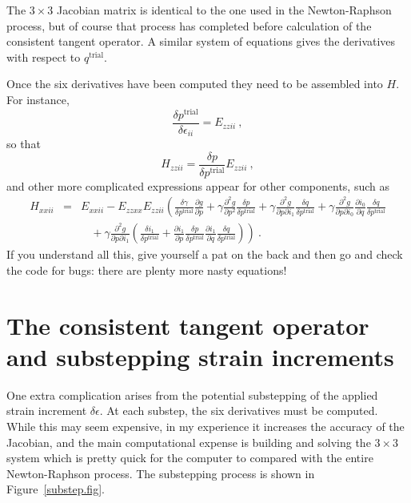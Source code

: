\documentclass[]{scrreprt}
\begin{document}
The $3\times 3$ Jacobian matrix is identical to the one used in the
Newton-Raphson process, but of course that process has completed
before calculation of the consistent tangent operator.  A similar
system of equations gives the derivatives with respect to
$q^{\mathrm{trial}}$.

Once the six derivatives have been computed they need to be assembled
into $H$.  For instance,
\begin{equation}
\frac{\delta p^{\mathrm{trial}}}{\delta \epsilon_{ii}} = E_{zzii}
\ ,
\end{equation}
so that
\begin{equation}
H_{zzii} = \frac{\delta p}{\delta p^{\mathrm{trial}}} E_{zzii} \ ,
\end{equation}
and other more complicated expressions appear for other components,
such as
\begin{eqnarray}
H_{xxii} & = & E_{xxii} - E_{zzxx} E_{zzii}\left( \frac{\delta \gamma}{\delta
  p^{\mathrm{trial}}} \frac{\partial g}{\partial p}
+ \gamma \frac{\partial^{2} g}{\partial p^{2}} \frac{\delta
  p}{\delta p^{\mathrm{trial}}}
+ \gamma \frac{\partial^{2} g}{\partial p\partial i_{1}} \frac{\delta
  q}{\delta p^{\mathrm{trial}}}
+ \gamma \frac{\partial^{2} g}{\partial p\partial i_{0}}
\frac{\partial i_{0}}{\partial q} \frac{\delta
  q}{\delta p^{\mathrm{trial}}} \right.
\nonumber \\
&& \ \ \ \
+ \left.
\gamma \frac{\partial^{2} g}{\partial p\partial i_{1}} \left(
\frac{\delta i_{1}}{\delta p^{\mathrm{trial}}} +
\frac{\partial i_{1}}{\partial p} \frac{\delta p}{\delta p^{\mathrm{trial}}}
\frac{\partial i_{1}}{\partial q} \frac{\delta q}{\delta
  p^{\mathrm{trial}}}
\right) \right) \ .
\end{eqnarray}
If you understand all this, give yourself a pat on the back and then
go and check the code for bugs: there are plenty more nasty equations!

\section{The consistent tangent operator and substepping strain
  increments}

One extra complication arises from the potential substepping of the
applied strain increment $\delta\epsilon$.  At each substep,
the six derivatives must be computed.  While this may seem expensive,
in my experience it increases the accuracy of the Jacobian, and the
main computational expense is building and solving the $3\times 3$
system which is pretty quick for the computer to compared with the
entire Newton-Raphson process.  The substepping process is shown in
Figure~\ref{substep.fig}.
\end{document}
